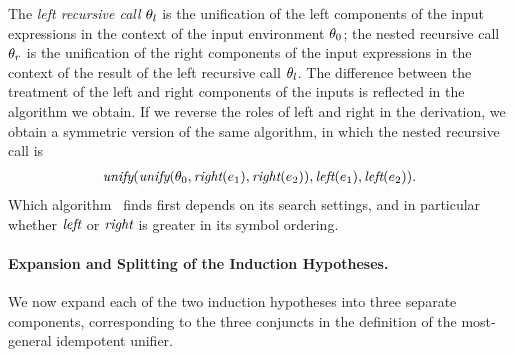 \documentclass[runningheads]{llncs}
\DeclareMathOperator{\unify}{\emph{unify}}
\DeclareMathOperator{\lef}{\emph{left}}
\DeclareMathOperator{\rig}{\emph{right}}
\begin{document}
The \emph{left recursive call} $\theta_{l}$ is the unification of the left components of the input expressions in the context of the input environment $\theta_{0}$; the nested recursive call $\theta_{r}$  is the unification of the right components of the input expressions in the context of the result of the left recursive call $\theta_{l}$. The difference between the treatment of the left and right components of the inputs is reflected in the algorithm we obtain.  If we reverse the roles of left and right in the derivation, we obtain a symmetric version of the same algorithm, in which the nested recursive call is
\[\begin{aligned}
\unify(
\begin{aligned}
   \unify(\thet{0}, 
  \rig(\e{1}),  
 \rig(\e{2})),
   \end{aligned} 
\lef(\e{1}), 
\lef(\e{2}))
 \end{aligned}. \]
Which algorithm \SNARK\ finds first depends on its search settings, and in particular whether $\lef$ or $\rig$ is greater in its symbol ordering.

\paragraph{Expansion and Splitting of the Induction Hypotheses.}
We now expand each of the two induction hypotheses into three separate components, corresponding to the three conjuncts in the definition of the most-general idempotent unifier.  
\end{document}
